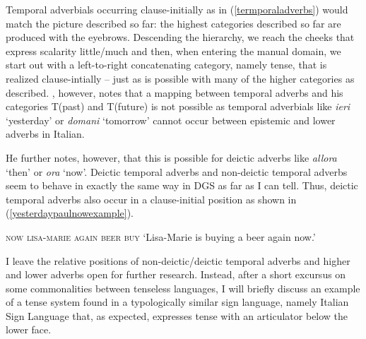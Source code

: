 \noindent Temporal adverbials occurring clause-initially as in (\ref{termporaladverbs}) would match the picture described so far: the highest categories described so far are produced with the eyebrows. Descending the hierarchy, we reach the cheeks that express scalarity little/much and then, when entering the manual domain, we start out with a left-to-right concatenating category, namely tense, that is realized clause-intially -- just as is possible with many of the higher categories as described. \citet[87]{cinque1999adverbs}, however, notes that a mapping between temporal adverbs and his categories T(past) and T(future) is not possible as temporal adverbials like \textit{ieri} `yesterday' or \textit{domani} `tomorrow' cannot occur between epistemic and lower adverbs in Italian.

He further notes, however, that this is possible for deictic adverbs like \textit{allora} `then' or \textit{ora} `now'. Deictic temporal adverbs and non-deictic temporal adverbs seem to behave in exactly the same way in DGS as far as I can tell. Thus, deictic temporal adverbs also occur in a clause-initial position as shown in (\ref{yesterdaypaulnowexample}).

\begin{exe}
\ex \textsc{now lisa-marie again beer buy} \label{yesterdaypaulnowexample}
\glt `Lisa-Marie is buying a beer again now.'
\end{exe}

\noindent I leave the relative positions of non-deictic/deictic temporal adverbs and higher and lower adverbs open for further research. Instead, after a short excursus on some commonalities between tenseless languages, I will briefly discuss an example of a tense system found in a typologically similar sign language, namely Italian Sign Language that, as expected, expresses tense with an articulator below the lower face.


